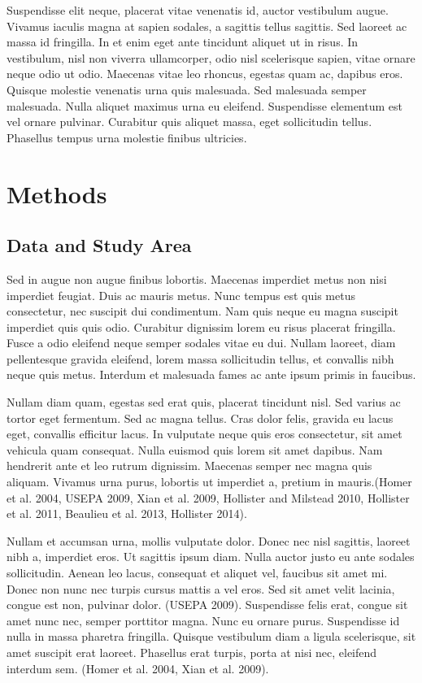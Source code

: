 \documentclass[10pt,a4paper,twocolumn]{article}
\begin{document}
Suspendisse elit neque, placerat vitae venenatis id, auctor vestibulum
augue. Vivamus iaculis magna at sapien sodales, a sagittis tellus
sagittis. Sed laoreet ac massa id fringilla. In et enim eget ante
tincidunt aliquet ut in risus. In vestibulum, nisl non viverra
ullamcorper, odio nisl scelerisque sapien, vitae ornare neque odio ut
odio. Maecenas vitae leo rhoncus, egestas quam ac, dapibus eros. Quisque
molestie venenatis urna quis malesuada. Sed malesuada semper malesuada.
Nulla aliquet maximus urna eu eleifend. Suspendisse elementum est vel
ornare pulvinar. Curabitur quis aliquet massa, eget sollicitudin tellus.
Phasellus tempus urna molestie finibus ultricies.

\section{Methods}\label{methods}

\subsection{Data and Study Area}\label{data-and-study-area}

Sed in augue non augue finibus lobortis. Maecenas imperdiet metus non
nisi imperdiet feugiat. Duis ac mauris metus. Nunc tempus est quis metus
consectetur, nec suscipit dui condimentum. Nam quis neque eu magna
suscipit imperdiet quis quis odio. Curabitur dignissim lorem eu risus
placerat fringilla. Fusce a odio eleifend neque semper sodales vitae eu
dui. Nullam laoreet, diam pellentesque gravida eleifend, lorem massa
sollicitudin tellus, et convallis nibh neque quis metus. Interdum et
malesuada fames ac ante ipsum primis in faucibus.

Nullam diam quam, egestas sed erat quis, placerat tincidunt nisl. Sed
varius ac tortor eget fermentum. Sed ac magna tellus. Cras dolor felis,
gravida eu lacus eget, convallis efficitur lacus. In vulputate neque
quis eros consectetur, sit amet vehicula quam consequat. Nulla euismod
quis lorem sit amet dapibus. Nam hendrerit ante et leo rutrum dignissim.
Maecenas semper nec magna quis aliquam. Vivamus urna purus, lobortis ut
imperdiet a, pretium in mauris.(Homer et al. 2004, USEPA 2009, Xian et
al. 2009, Hollister and Milstead 2010, Hollister et al. 2011, Beaulieu
et al. 2013, Hollister 2014).

Nullam et accumsan urna, mollis vulputate dolor. Donec nec nisl
sagittis, laoreet nibh a, imperdiet eros. Ut sagittis ipsum diam. Nulla
auctor justo eu ante sodales sollicitudin. Aenean leo lacus, consequat
et aliquet vel, faucibus sit amet mi. Donec non nunc nec turpis cursus
mattis a vel eros. Sed sit amet velit lacinia, congue est non, pulvinar
dolor. (USEPA 2009). Suspendisse felis erat, congue sit amet nunc nec,
semper porttitor magna. Nunc eu ornare purus. Suspendisse id nulla in
massa pharetra fringilla. Quisque vestibulum diam a ligula scelerisque,
sit amet suscipit erat laoreet. Phasellus erat turpis, porta at nisi
nec, eleifend interdum sem. (Homer et al. 2004, Xian et al. 2009).
\end{document}
